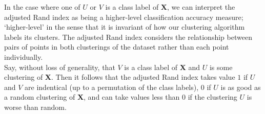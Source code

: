 \begin{remark}
    In the case where one of \(U\) or \(V\) is a class label of \textbf{X}, we
    can interpret the adjusted Rand index as being a higher-level classification
    accuracy measure; `higher-level' in the sense that it is invariant of how
    our clustering algorithm labels its clusters. The adjusted Rand index
    considers the relationship between pairs of points in both clusterings of
    the dataset rather than each point individually.\\
    
    Say, without loss of generality, that \(V\) is a class label of \textbf{X}
    and \(U\) is some clustering of \textbf{X}. Then it follows that the
    adjusted Rand index takes value \(1\) if \(U\) and \(V\) are indentical (up
    to a permutation of the class labels), \(0\) if \(U\) is as good as a random
    clustering of \textbf{X}, and can take values less than \(0\) if the
    clustering \(U\) is worse than random.\\
\end{remark}

